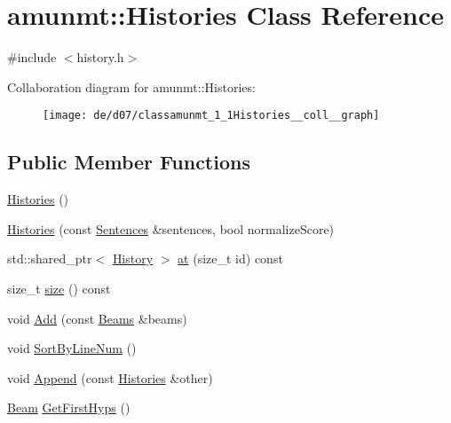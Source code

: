 \hypertarget{classamunmt_1_1Histories}{}\section{amunmt\+:\+:Histories Class Reference}
\label{classamunmt_1_1Histories}


{\ttfamily \#include $<$history.\+h$>$}



Collaboration diagram for amunmt\+:\+:Histories\+:
\nopagebreak
\begin{figure}[H]
\begin{center}
\leavevmode
\texttt{[image: de/d07/classamunmt\_1\_1Histories\_\_coll\_\_graph]}
\end{center}
\end{figure}
\subsection*{Public Member Functions}
\begin{DoxyCompactItemize}
\item 
\hyperlink{classamunmt_1_1Histories_a33bfdb800a56a0b22e380d526bcd8bd0}{Histories} ()
\item 
\hyperlink{classamunmt_1_1Histories_a87f59abc788622fab88049244f3a5d12}{Histories} (const \hyperlink{classamunmt_1_1Sentences}{Sentences} \&sentences, bool normalize\+Score)
\item 
std\+::shared\+\_\+ptr$<$ \hyperlink{classamunmt_1_1History}{History} $>$ \hyperlink{classamunmt_1_1Histories_a757045db713628fa453bdebd8a35be29}{at} (size\+\_\+t id) const 
\item 
size\+\_\+t \hyperlink{classamunmt_1_1Histories_afa810d825474a48115d2b0691d014bd5}{size} () const 
\item 
void \hyperlink{classamunmt_1_1Histories_ad20c0157f71101a93f7c4d4802d1e80a}{Add} (const \hyperlink{namespaceamunmt_a90a1b353bc62cb90bc8e8da7edc3edc0}{Beams} \&beams)
\item 
void \hyperlink{classamunmt_1_1Histories_a1cd0e1d06d2ebea1e026f03592f0e492}{Sort\+By\+Line\+Num} ()
\item 
void \hyperlink{classamunmt_1_1Histories_ac2fc201d1dcfc3a689b71f3da4769bd3}{Append} (const \hyperlink{classamunmt_1_1Histories}{Histories} \&other)
\item 
\hyperlink{namespaceamunmt_a534a3a9a1d99c01a5adf05e700a26012}{Beam} \hyperlink{classamunmt_1_1Histories_a50c82a944c20c3d0d06ee93d1eab1b5b}{Get\+First\+Hyps} ()
\end{DoxyCompactItemize}
